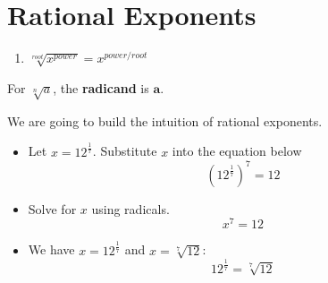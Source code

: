 \documentclass{article}
\begin{document}
\section*{Rational Exponents}

\begin{tcolorbox}[colframe=orange!70!white, colback = white, coltitle=black, title=\textbf{Summary}]
\begin{enumerate}
    \item $\sqrt[root]{x^{power}} = x^{power/root}$
\end{enumerate}
\end{tcolorbox}
\bigskip 

\begin{tcolorbox}[colframe=green!60!black, colback = white,title=\textbf{Radicand}]
For $\sqrt[n]{a}$, the \textbf{radicand} is $\bm{a}$.
\end{tcolorbox}
\bigskip

We are going to build the intuition of rational exponents.

\begin{itemize}
\vspace{0.25in}
    \item Let $x = 12^{\tfrac{1}{7}}$. Substitute $x$ into the equation below
    \[
    (12^{\tfrac{1}{7}})^7 = 12
    \]
\vspace{0.25in} 
    \item Solve for $x$ using radicals.
    \[
    x^7 = 12
    \]
\vspace{0.25in}
    \item We have $x = 12^{\tfrac{1}{7}}$ and $x = \sqrt[7]{12}$:
    \[
    \boxed{12^{\tfrac{1}{7}} = \sqrt[7]{12}}
    \]
\end{itemize}



\end{document}

